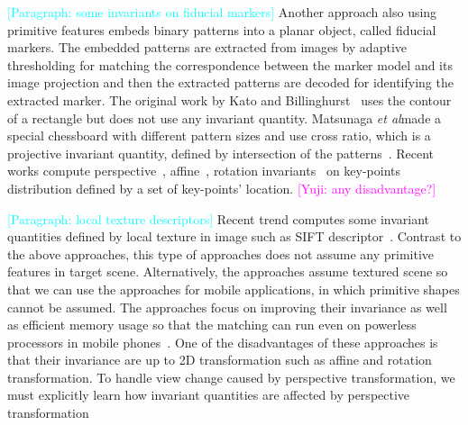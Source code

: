 \documentclass{bmvc2k}
\newcommand{\parmessage}[1]{\textcolor{cyan}{[Paragraph: #1]}}
\newcommand{\yuji}[1]{\textcolor{magenta}{[Yuji: #1]}}
\def\etal{\emph{et al}\bmvaOneDot}
\begin{document}
\par 
\parmessage{some invariants on fiducial markers}
Another approach also using primitive features embeds binary patterns into a planar object, called fiducial markers.
The embedded patterns are extracted from images by adaptive thresholding for matching the correspondence between the marker model and its image projection and then the extracted patterns are decoded for identifying the extracted marker.
The original work by Kato and Billinghurst~\cite{Kato1999} uses the contour of a rectangle but does not use any invariant quantity.
Matsunaga \etal made a special chessboard with different pattern sizes and use cross ratio, which is a projective invariant quantity, defined by intersection of the patterns~\cite{Matsunaga2000}.
Recent works compute perspective~\cite{Nakai2005}, affine~\cite{Nakai2006}, rotation invariants~\cite{Uchiyama2011a} on key-points distribution defined by a set of key-points' location.
\yuji{any disadvantage?}

\par 
\parmessage{local texture descriptors}
Recent trend computes some invariant quantities defined by local texture in image such as SIFT descriptor~\cite{Lowe1999}.
Contrast to the above approaches, this type of approaches does not assume any primitive features in target scene.
Alternatively, the approaches assume textured scene so that we can use the approaches for mobile applications, in which primitive shapes cannot be assumed.
The approaches focus on improving their invariance as well as efficient memory usage so that the matching can run even on powerless processors in mobile phones~\cite{Ke2004,Calonder2010}.
One of the disadvantages of these approaches is that their invariance are up to 2D transformation such as affine and rotation transformation.
To handle view change caused by perspective transformation, we must explicitly learn how invariant quantities are affected by perspective transformation~\cite{Kurz2012,Lepetit2006}
\end{document}
